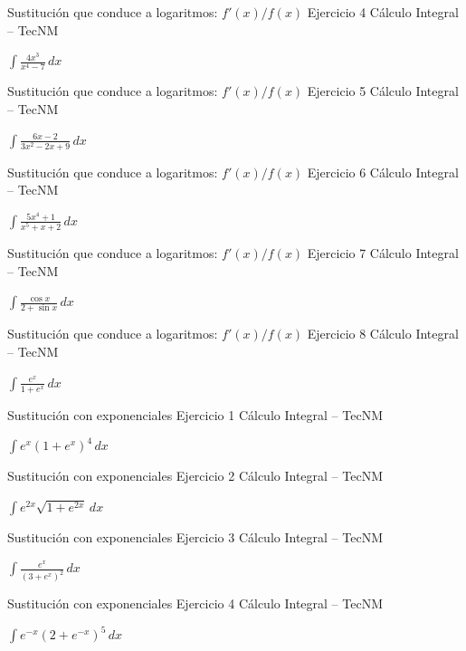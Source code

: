 \documentclass[aspectratio=169,12pt]{beamer}
\newcommand{\ejercicio}[1]{%
  \begin{center}
  \vfill
  {\fontsize{24}{30}\selectfont #1}
  \vfill
  \end{center}
}
\begin{document}
\begin{frame}{Sustitución que conduce a logaritmos: $f'(x)/f(x)$}
\small Ejercicio 4 \hfill Cálculo Integral -- TecNM
\ejercicio{$\displaystyle \int\frac{4x^3}{x^4-7}\,dx$}
\end{frame}

\begin{frame}{Sustitución que conduce a logaritmos: $f'(x)/f(x)$}
\small Ejercicio 5 \hfill Cálculo Integral -- TecNM
\ejercicio{$\displaystyle \int\frac{6x-2}{3x^2-2x+9}\,dx$}
\end{frame}

\begin{frame}{Sustitución que conduce a logaritmos: $f'(x)/f(x)$}
\small Ejercicio 6 \hfill Cálculo Integral -- TecNM
\ejercicio{$\displaystyle \int\frac{5x^4+1}{x^5+x+2}\,dx$}
\end{frame}

\begin{frame}{Sustitución que conduce a logaritmos: $f'(x)/f(x)$}
\small Ejercicio 7 \hfill Cálculo Integral -- TecNM
\ejercicio{$\displaystyle \int\frac{\cos x}{2+\sin x}\,dx$}
\end{frame}

\begin{frame}{Sustitución que conduce a logaritmos: $f'(x)/f(x)$}
\small Ejercicio 8 \hfill Cálculo Integral -- TecNM
\ejercicio{$\displaystyle \int\frac{e^x}{1+e^x}\,dx$}
\end{frame}

\begin{frame}{Sustitución con exponenciales}
\small Ejercicio 1 \hfill Cálculo Integral -- TecNM
\ejercicio{$\displaystyle \int e^x(1+e^x)^4\,dx$}
\end{frame}

\begin{frame}{Sustitución con exponenciales}
\small Ejercicio 2 \hfill Cálculo Integral -- TecNM
\ejercicio{$\displaystyle \int e^{2x}\sqrt{1+e^{2x}}\,dx$}
\end{frame}

\begin{frame}{Sustitución con exponenciales}
\small Ejercicio 3 \hfill Cálculo Integral -- TecNM
\ejercicio{$\displaystyle \int\frac{e^x}{(3+e^x)^2}\,dx$}
\end{frame}

\begin{frame}{Sustitución con exponenciales}
\small Ejercicio 4 \hfill Cálculo Integral -- TecNM
\ejercicio{$\displaystyle \int e^{-x}(2+e^{-x})^5\,dx$}
\end{frame}
\end{document}
